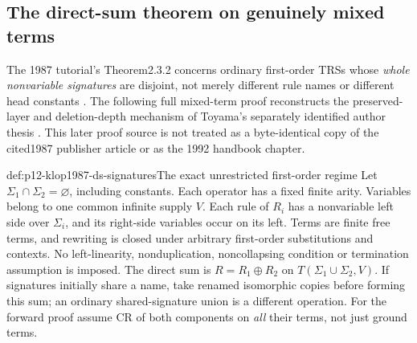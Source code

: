 \subsection{The direct-sum theorem on genuinely mixed terms}
\label{sec:p12-klop1987-direct-sum-proof}

The 1987 tutorial's Theorem2.3.2 concerns ordinary first-order TRSs
whose \emph{whole nonvariable signatures} are disjoint, not merely
different rule names or different head constants
\parencite[pp.15--17]{Klop1987CWITutorial}. The following full
mixed-term proof reconstructs the preserved-layer and deletion-depth
mechanism of Toyama's separately identified author thesis
\parencite[\S2.2, pp.19--44]{Toyama1990DirectSumProof}.
This later proof source is not treated as a byte-identical copy of
the cited1987 publisher article or as the 1992 handbook chapter.

\begin{hbdefinition}{def:p12-klop1987-ds-signatures}{The exact unrestricted first-order regime}
Let \(\Sigma_1\cap\Sigma_2=\varnothing\), including constants.
Each operator has a fixed finite arity. Variables belong to one
common infinite supply \(V\). Each rule of \(R_i\) has a
nonvariable left side over \(\Sigma_i\), and its right-side
variables occur on its left. Terms are finite free terms, and
rewriting is closed under arbitrary first-order substitutions and
contexts. No left-linearity, nonduplication, noncollapsing condition
or termination assumption is imposed. The direct sum is
\(R=R_1\oplus R_2\) on \(T(\Sigma_1\cup\Sigma_2,V)\).
If signatures initially share a name, take renamed isomorphic
copies before forming this sum; an ordinary shared-signature union
is a different operation.
For the forward proof assume CR of both components on \emph{all}
their terms, not just ground terms.
\end{hbdefinition}

